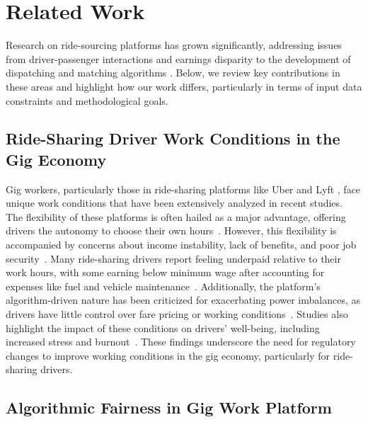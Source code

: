 \section{Related Work}

Research on ride-sourcing platforms has grown significantly, addressing issues from driver-passenger interactions and earnings disparity to the development of dispatching and matching algorithms \cite{chen2019value, ruch2020quantifying, hall2018analysis}. 
Below, we review key contributions in these areas and highlight how our work differs, particularly in terms of input data constraints and methodological goals.

\subsection{Ride-Sharing Driver Work Conditions in the Gig Economy}

Gig workers, particularly those in ride-sharing platforms like Uber and Lyft \cite{barrios2022launching}, face unique work conditions that have been extensively analyzed in recent studies. The flexibility of these platforms is often hailed as a major advantage, offering drivers the autonomy to choose their own hours~\cite{tan2021ethical}. However, this flexibility is accompanied by concerns about income instability, lack of benefits, and poor job security~\cite{rosenblat2018uberland}. Many ride-sharing drivers report feeling underpaid relative to their work hours, with some earning below minimum wage after accounting for expenses like fuel and vehicle maintenance~\cite{bajwa2018health, brown2024driving, mishel2018uber}. Additionally, the platform's algorithm-driven nature has been criticized for exacerbating power imbalances, as drivers have little control over fare pricing or working conditions~\cite{lobel2017gig, zhu2024gig, kloostra2022algorithmic}. Studies also highlight the impact of these conditions on drivers' well-being, including increased stress and burnout~\cite{berger2019uber}. These findings underscore the need for regulatory changes to improve working conditions in the gig economy, particularly for ride-sharing drivers.

\subsection{Algorithmic Fairness in Gig Work Platform}

